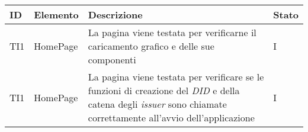 \begin{center}
\label{tab:test-integrazione}
\begin{longtable}{|C{2.0cm}|C{3.0cm}|C{8.0cm}|C{2.0cm}|}
\hline
\textbf{ID} & \textbf{Elemento} & \textbf{Descrizione} & \textbf{Stato} \\
\hline
TI1 & HomePage & La pagina viene testata per verificarne il caricamento grafico e delle sue componenti & I \\
\hline
TI1 & HomePage & La pagina viene testata per verificare se le funzioni di creazione del \textit{DID} e della catena degli \textit{issuer} sono chiamate correttamente all'avvio dell'applicazione & I \\
\hline
\end{longtable}
\end{center}

\clearpage


